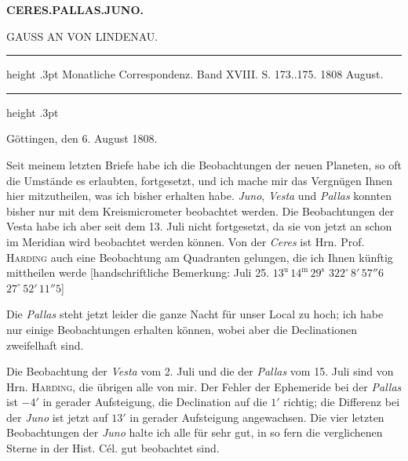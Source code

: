 \clearpage
\thispagestyle{empty}
\noindent{}%
\makebox[12mm][l]{}%
\parbox[t]{\dimexpr\linewidth-24mm\relax}{\centering\footnotesize\bfseries CERES.\enspace PALLAS.\enspace JUNO.\par}%
\par\nobreak\medskip
\begin{center}\large GAUSS AN VON LINDENAU.\end{center}
\begin{center}\parbox{.87\linewidth}{\centering\footnotesize\frenchspacing
\hrule height .3pt\relax\vspace{2.5pt}
Monatliche Correspondenz. Band XVIII. S. 173..175. 1808 August.\par
\vspace{2.5pt}\hrule height .3pt\relax
}\end{center}

\begin{flushright}
Göttingen, den 6. August 1808.
\end{flushright}

\par\indent Seit meinem letzten Briefe habe ich die Beobachtungen der neuen Planeten, so oft die Umstände
es erlaubten, fortgesetzt, und ich mache mir das Vergnügen Ihnen hier mitzutheilen, was ich bisher
erhalten habe. \emph{Juno}, \emph{Vesta} und \emph{Pallas} konnten bisher nur mit dem Kreismicrometer beobachtet werden.
Die Beobachtungen der Vesta habe ich aber seit dem 13. Juli nicht fortgesetzt, da sie von jetzt an schon
im Meridian wird beobachtet werden können. Von der \emph{Ceres} ist Hrn. Prof. \textsc{Harding} auch eine Beobachtung am Quadranten gelungen, die ich Ihnen künftig mittheilen werde [handschriftliche Bemerkung:
Juli 25. $13^{\text{u}}\,14^{\text{m}}\,29^{\text{s}}$ \quad $322^\circ\,8'\,57''6$ \quad $27^\circ\,52'\,11''5$]

\par\indent Die \emph{Pallas} steht jetzt leider die ganze Nacht für unser Local zu hoch; ich habe nur einige Beobachtungen erhalten können, wobei aber die Declinationen zweifelhaft sind.

\par\indent Die Beobachtung der \emph{Vesta} vom 2. Juli und die der \emph{Pallas} vom 15. Juli sind von Hrn. \textsc{Harding},
die übrigen alle von mir. Der Fehler der Ephemeride bei der \emph{Pallas} ist $-4'$ in gerader Aufsteigung,
die Declination auf die $1'$ richtig; die Differenz bei der \emph{Juno} ist jetzt auf $13'$ in gerader Aufsteigung
angewachsen. Die vier letzten Beobachtungen der \emph{Juno} halte ich alle für sehr gut, in so fern die verglichenen Sterne in der Hist. Cél. gut beobachtet sind.

